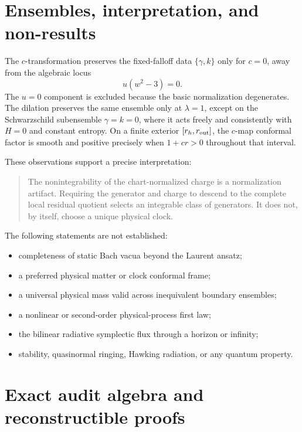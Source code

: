 \documentclass[11pt]{article}
\theoremstyle{definition}
\theoremstyle{remark}
\begin{document}
\section{Ensembles, interpretation, and non-results}

The \(c\)-transformation preserves the fixed-falloff data
\(\{\gamma,k\}\) only for \(c=0\), away from the algebraic locus
\[
 u(w^2-3)=0.
\]
The \(u=0\) component is excluded because the basic normalization
degenerates.  The dilation preserves the same ensemble only at
\(\lambda=1\), except on the Schwarzschild subensemble
\(\gamma=k=0\), where it acts freely and consistently with \(H=0\) and
constant entropy.  On a finite exterior \([r_h,r_{\rm out}]\), the
\(c\)-map conformal factor is smooth and positive precisely when
\(1+cr>0\) throughout that interval.

These observations support a precise interpretation:
\begin{quote}
The nonintegrability of the chart-normalized charge is a normalization
artifact.  Requiring the generator and charge to descend to the complete
local residual quotient selects an integrable class of generators.  It does
not, by itself, choose a unique physical clock.
\end{quote}

The following statements are not established:
\begin{itemize}
\item completeness of static Bach vacua beyond the Laurent ansatz;
\item a preferred physical matter or clock conformal frame;
\item a universal physical mass valid across inequivalent boundary
      ensembles;
\item a nonlinear or second-order physical-process first law;
\item the bilinear radiative symplectic flux through a horizon or infinity;
\item stability, quasinormal ringing, Hawking radiation, or any quantum
      property.
\end{itemize}

\section{Exact audit algebra and reconstructible proofs}
\label{app:audit-algebra}
\end{document}
